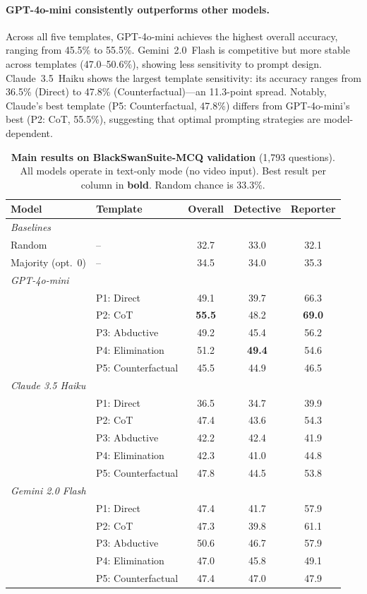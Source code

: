 \paragraph{GPT-4o-mini consistently outperforms other models.}
Across all five templates, GPT-4o-mini achieves the highest overall accuracy, ranging from 45.5\% to 55.5\%.
Gemini~2.0~Flash is competitive but more stable across templates (47.0--50.6\%), showing less sensitivity to prompt design.
Claude~3.5~Haiku shows the largest template sensitivity: its accuracy ranges from 36.5\% (Direct) to 47.8\% (Counterfactual)---an 11.3-point spread.
Notably, Claude's best template (P5: Counterfactual, 47.8\%) differs from GPT-4o-mini's best (P2: CoT, 55.5\%), suggesting that optimal prompting strategies are model-dependent.

\begin{table}[t]
\centering
\caption{\textbf{Main results on BlackSwanSuite-MCQ validation} (1{,}793 questions). All models operate in text-only mode (no video input). Best result per column in \textbf{bold}. Random chance is 33.3\%.}
\label{tab:main}
\small
\setlength{\tabcolsep}{4pt}
\begin{tabular}{@{}llccc@{}}
\toprule
\textbf{Model} & \textbf{Template} & \textbf{Overall} & \textbf{Detective} & \textbf{Reporter} \\
\midrule
\multicolumn{5}{l}{\textit{Baselines}} \\
Random & -- & 32.7 & 33.0 & 32.1 \\
Majority (opt.\ 0) & -- & 34.5 & 34.0 & 35.3 \\
\midrule
\multicolumn{5}{l}{\textit{GPT-4o-mini}} \\
 & P1: Direct & 49.1 & 39.7 & 66.3 \\
 & P2: CoT & \textbf{55.5} & 48.2 & \textbf{69.0} \\
 & P3: Abductive & 49.2 & 45.4 & 56.2 \\
 & P4: Elimination & 51.2 & \textbf{49.4} & 54.6 \\
 & P5: Counterfactual & 45.5 & 44.9 & 46.5 \\
\midrule
\multicolumn{5}{l}{\textit{Claude 3.5 Haiku}} \\
 & P1: Direct & 36.5 & 34.7 & 39.9 \\
 & P2: CoT & 47.4 & 43.6 & 54.3 \\
 & P3: Abductive & 42.2 & 42.4 & 41.9 \\
 & P4: Elimination & 42.3 & 41.0 & 44.8 \\
 & P5: Counterfactual & 47.8 & 44.5 & 53.8 \\
\midrule
\multicolumn{5}{l}{\textit{Gemini 2.0 Flash}} \\
 & P1: Direct & 47.4 & 41.7 & 57.9 \\
 & P2: CoT & 47.3 & 39.8 & 61.1 \\
 & P3: Abductive & 50.6 & 46.7 & 57.9 \\
 & P4: Elimination & 47.0 & 45.8 & 49.1 \\
 & P5: Counterfactual & 47.4 & 47.0 & 47.9 \\
\bottomrule
\end{tabular}
\end{table}

